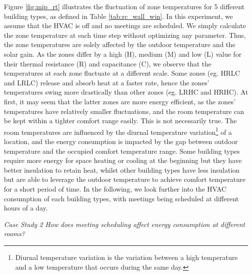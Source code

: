 Figure \ref{fig:mip_rt} illustrates the fluctuation of zone temperatures for 5 different building types, as defined in Table \ref{tab:rc_wall_win}. In this experiment, we assume that the HVAC is off and no meetings are scheduled. We simply calculate the zone temperature at each time step without optimizing any parameter. Thus, the zone temperatures are solely affected by the outdoor temperature and the solar gain. As the zones differ by a high (H), medium (M) and low (L) value for their thermal resistance (R) and capacitance (C), we observe that the temperatures at each zone fluctuate at a different scale. Some zones (eg. HRLC and LRLC) release and absorb heat at a faster rate, hence the zones' temperatures swing more drastically than other zones (eg. LRHC and HRHC). %
At first, it may seem that the latter zones are more energy efficient, as the zones' temperatures have relatively smaller fluctuations, and the room temperature can be kept within a tighter comfort range easily.
This is not necessarily true. The room temperatures are influenced by the diurnal temperature variation\footnote{Diurnal temperature variation is the variation between a high temperature and a low temperature that occurs during the same day.} of a location, and the energy consumption is impacted by the gap between outdoor temperature and the occupied comfort temperature range. Some building types require more energy for space heating or cooling at the beginning but they have better insulation to retain heat, whilst other building types have less insulation but are able to leverage the outdoor temperature to achieve comfort temperature for a short period of time. %
In the following, we look further into the HVAC consumption of each building types, with meetings being scheduled at different hours of a day.

\vspace{10px}
\emph{Case Study 2} \quad \textsl{How does meeting scheduling affect energy consumption at different rooms?}
\vspace{10px}

